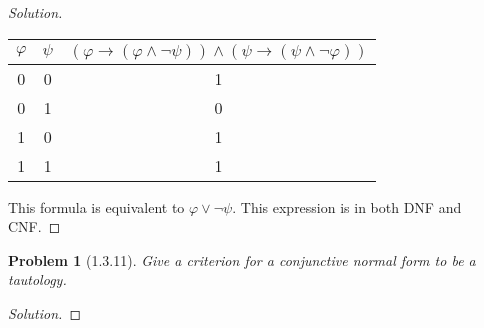 \documentclass[letter]{article}
\newtheorem{problem}{Problem}
\theoremstyle{definition}
\newenvironment{solution}
{\begin{proof}[Solution]}
        {\end{proof}}
\renewcommand{\phi}{\varphi}
\begin{document}
\begin{solution}
\begin{center}
\begin{tabular}{|c|c|c|}
  \hline
  $\phi$ & $\psi$ &  $(\phi \to (\phi \land \neg \psi)) \land (\psi \to (\psi \land \neg \phi))$\\
  \hline
  0 & 0 & 1 \\
  \hline
  0 & 1 & 0 \\
  \hline
  1 & 0 & 1\\
  \hline
  1 & 1 & 1\\
  \hline
\end{tabular}
\end{center}

This formula is equivalent to $\phi \lor \lnot \psi$. This expression is in both DNF and CNF.

\end{solution}

\begin{problem}[1.3.11] Give a criterion for a conjunctive normal form to be a tautology.
\end{problem}
\begin{solution}
\end{solution}
\end{document}

